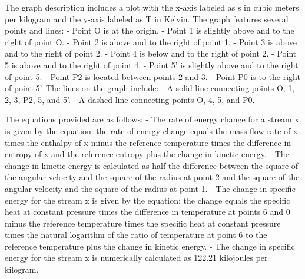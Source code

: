 The graph description includes a plot with the x-axis labeled as s in cubic meters per kilogram and the y-axis labeled as T in Kelvin. The graph features several points and lines:
- Point O is at the origin.
- Point 1 is slightly above and to the right of point O.
- Point 2 is above and to the right of point 1.
- Point 3 is above and to the right of point 2.
- Point 4 is below and to the right of point 2.
- Point 5 is above and to the right of point 4.
- Point 5' is slightly above and to the right of point 5.
- Point P2 is located between points 2 and 3.
- Point P0 is to the right of point 5'.
The lines on the graph include:
- A solid line connecting points O, 1, 2, 3, P2, 5, and 5'.
- A dashed line connecting points O, 4, 5, and P0.

The equations provided are as follows:
- The rate of energy change for a stream x is given by the equation: the rate of energy change equals the mass flow rate of x times the enthalpy of x minus the reference temperature times the difference in entropy of x and the reference entropy plus the change in kinetic energy.
- The change in kinetic energy is calculated as half the difference between the square of the angular velocity and the square of the radius at point 2 and the square of the angular velocity and the square of the radius at point 1.
- The change in specific energy for the stream x is given by the equation: the change equals the specific heat at constant pressure times the difference in temperature at points 6 and 0 minus the reference temperature times the specific heat at constant pressure times the natural logarithm of the ratio of temperature at point 6 to the reference temperature plus the change in kinetic energy.
- The change in specific energy for the stream x is numerically calculated as 122.21 kilojoules per kilogram.